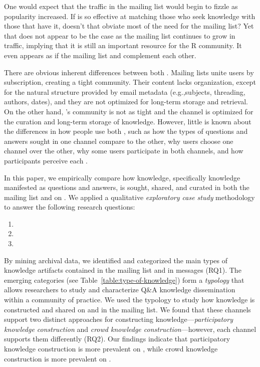 One would expect that the traffic in the \RH mailing list would begin to fizzle as \SO popularity increased. If \SO is so effective at matching those who seek knowledge with those that have it, doesn't that obviate most of the need for the \RH mailing list? Yet that does not appear to be the case as the \RH mailing list continues to grow in traffic, implying that it is still an important resource for the R community. It even appears as if the mailing list and \SO complement each other.

There are obvious inherent differences between both \channels. Mailing lists unite users by subscription, creating a tight community. Their content lacks organization, except for the natural structure provided by email metadata (e.g.,subjects, threading, authors, dates), and they are not optimized for long-term storage and retrieval. On the other hand, \SO's community is not as tight and the channel is optimized for the curation and long-term storage of knowledge. However, little is known about the differences in how people use both \channels, such as how the types of questions and answers sought in one channel compare to the other, why users choose one channel over the other, why some users participate in both channels, and how participants perceive each \channel.



In this paper, we empirically compare how knowledge, specifically knowledge manifested as questions and answers, is sought, shared, and curated in both the \RH mailing list and on \SO. We applied a qualitative \textit{exploratory case study} methodology to answer the following research questions:

\begin{enumerate}[label=\bfseries{RQ\arabic*.},itemsep=3pt, topsep=2pt, leftmargin=3em, parsep=0pt]
        \item \rqa
        \item \rqb
        \item \rqc
    \end{enumerate}

By mining archival data, we identified and categorized the main types of knowledge artifacts contained in the \RH mailing list and in \SO messages (RQ1). The emerging categories (see Table~\ref{table:type-of-knowledge}) form a \textit{typology} that allows researchers to study and characterize Q\&A knowledge dissemination within a community of practice. We used the typology to study how knowledge is constructed and shared on \SO and in the \RH mailing list. We found that these channels support two distinct approaches for constructing knowledge---\textit{participatory knowledge construction} and \textit{crowd knowledge construction}---however, each channel supports them differently (RQ2). Our findings indicate that participatory knowledge construction is more prevalent on \RH, while crowd knowledge construction is more prevalent on \SO.

